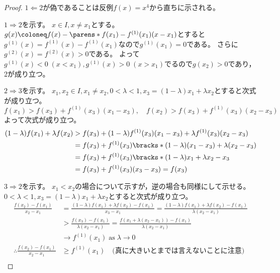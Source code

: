             \begin{proof}
                $1\Leftarrow 2$が偽であることは反例$f(x) = x^4$から直ちに示される。
                \par
                $1\Rightarrow 2$を示す。
                $x\in I,x\neq x_1$とする。
                $g(x) \coloneq f(x) - \parens*{f(x_1) - f^{(1)}(x_1)(x-x_1)}$とすると$g^{(1)}(x) = f^{(1)}(x) - f^{(1)}(x_1)$なので$g^{(1)}(x_1) = 0$である。
                さらに$g^{(2)}(x) = f^{(2)}(x) > 0$である。
                よって$g^{(1)}(x) < 0\;(x<x_1), g^{(1)}(x) > 0\;(x>x_1)$でるので$g(x_2) > 0$であり，2が成り立つ。
                \par
                $2\Rightarrow 3$を示す。
                $x_1,x_2\in I,x_1\neq x_2,0<\lambda<1,x_3 = (1-\lambda)x_1 + \lambda x_2$とすると次式が成り立つ。
                \[ f(x_1) > f(x_3) + f^{(1)}(x_3)(x_1-x_3),\quad f(x_2) > f(x_3) + f^{(1)}(x_3)(x_2-x_3) \]
                よって次式が成り立つ。
                \begin{align*}
                    (1-\lambda)f(x_1) + \lambda f(x_2) &> f(x_3) + (1-\lambda)f^{(1)}(x_3)(x_1-x_3) + \lambda f^{(1)}(x_3)(x_2-x_3) \\
                    &= f(x_3) + f^{(1)}(x_3)\bracks*{(1-\lambda)(x_1-x_3) + \lambda(x_2-x_3)} \\
                    &= f(x_3) + f^{(1)}(x_3)\bracks*{(1-\lambda)x_1 + \lambda x_2 - x_3} \\
                    &= f(x_3) + f^{(1)}(x_3)(x_3-x_3) = f(x_3)
                \end{align*}
                \par
                $3\Rightarrow 2$を示す。
                $x_1<x_2$の場合について示すが，逆の場合も同様にして示せる。
                $0<\lambda<1,x_3 = (1-\lambda)x_1 + \lambda x_2$とすると次式が成り立つ。
                \begin{align*}
                    \frac{f(x_2)-f(x_1)}{x_2-x_1} &= \frac{(1-\lambda)f(x_1) + \lambda f(x_2) - f(x_1)}{x_3-x_1} = \frac{(1-\lambda)f(x_1) + \lambda f(x_2) - f(x_1)}{\lambda(x_2-x_1)} \\
                    &> \frac{f(x_3) - f(x_1)}{\lambda(x_2-x_1)} = \frac{f(x_1 + \lambda(x_2-x_1)) - f(x_1)}{\lambda(x_2-x_1)} \tag{1} \\
                    &\to f^{(1)}(x_1)\; \text{as}\; \lambda\to 0 \\
                    \therefore \frac{f(x_2)-f(x_1)}{x_2-x_1} &\geq f^{(1)}(x_1) \quad \text{(真に大きいとまでは言えないことに注意)} \\

\end{align*}
\end{proof}
